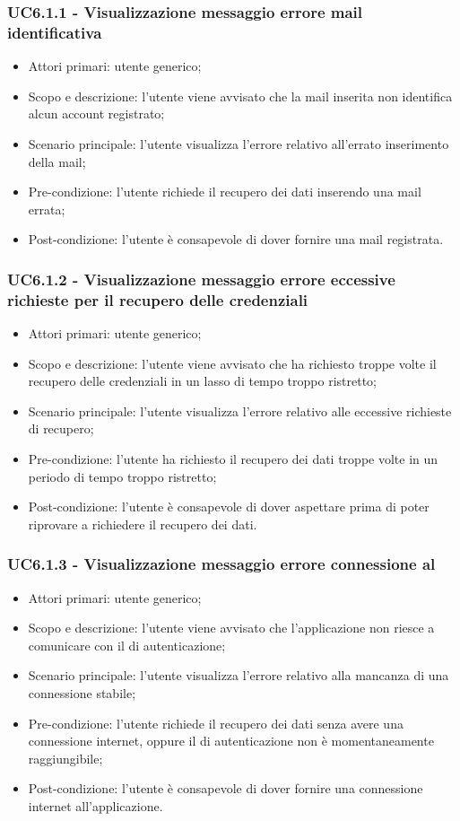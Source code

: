 \subsubsection{UC6.1.1 - Visualizzazione messaggio errore mail identificativa}
\begin{itemize}
	\item  Attori primari: utente generico;
	\item  Scopo e descrizione: l'utente viene avvisato che la mail inserita non identifica alcun account registrato;
	\item  Scenario principale: l'utente visualizza l'errore relativo all'errato inserimento della mail;
	\item  Pre-condizione: l'utente richiede il recupero dei dati inserendo una mail errata;
	\item  Post-condizione: l'utente è consapevole di dover fornire una mail registrata.
\end{itemize}
\subsubsection{UC6.1.2 - Visualizzazione messaggio errore eccessive richieste per il recupero delle credenziali}
\begin{itemize}
	\item  Attori primari: utente generico;
	\item  Scopo e descrizione: l'utente viene avvisato che ha richiesto troppe volte il recupero delle credenziali in un lasso di tempo troppo ristretto;
	\item  Scenario principale: l'utente visualizza l'errore relativo alle eccessive richieste di recupero;
	\item  Pre-condizione: l'utente ha richiesto il recupero dei dati troppe volte in un periodo di tempo troppo ristretto;
	\item  Post-condizione: l'utente è consapevole di dover aspettare prima di poter riprovare a richiedere il recupero dei dati.
\end{itemize}
\subsubsection{UC6.1.3 - Visualizzazione messaggio errore connessione al }
\begin{itemize}
	\item  Attori primari: utente generico;
	\item  Scopo e descrizione: l'utente viene avvisato che l'applicazione non riesce a comunicare con il   di autenticazione;
	\item  Scenario principale: l'utente visualizza l'errore relativo alla mancanza di una connessione stabile;
	\item  Pre-condizione: l'utente richiede il recupero dei dati senza avere una connessione internet, oppure il  di autenticazione non è momentaneamente raggiungibile;
	\item  Post-condizione: l'utente è consapevole di dover fornire una connessione internet all'applicazione.
\end{itemize}
